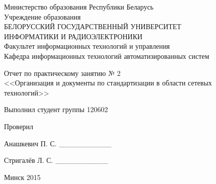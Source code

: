 \thispagestyle{empty}
\setlength{\parindent}{0ex} %

\begin{center}
  Министерство образования Республики Беларусь \\
  \vspace{0.5ex}
  Учреждение образования \\
  БЕЛОРУССКИЙ ГОСУДАРСТВЕННЫЙ УНИВЕРСИТЕТ \\
  ИНФОРМАТИКИ И РАДИОЭЛЕКТРОНИКИ \\
  \vspace{0.5ex}
  Факультет информационных технологий и управления \\
  \vspace{0.5ex}
  Кафедра информационных технологий автоматизированных систем
\end{center}

\vspace{50mm}

\begin{center}
  Отчет по практическому занятию № 2 \\
  <<Организация и документы по стандартизации в области сетевых технологий>>
\end{center}

\vspace{55mm}

\begin{minipage}{.55\linewidth}
    Выполнил студент группы 120602

    \smallskip

    Проверил
\end{minipage}
\hfill
\begin{minipage}{.4\linewidth}
  \begin{flushright}
    Анашкевич П. С. \_\_\_\_\_\_\_\_\_\_

    \smallskip

    Стригалёв Л. С. \_\_\_\_\_\_\_\_\_\_
  \end{flushright}
\end{minipage}

\vspace{45mm}
\begin{center}
  Минск 2015
\end{center}

\setlength{\parindent}{1.25cm} %

\newpage
